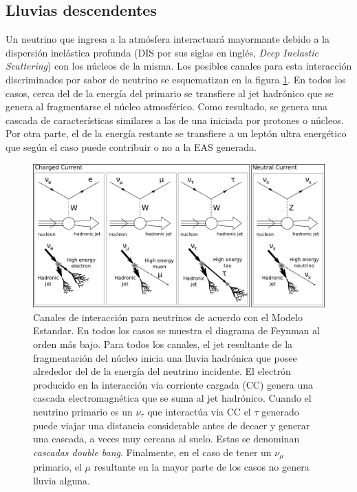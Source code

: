 \subsection{Lluvias descendentes}
\label{sbsc:easDG}

Un neutrino que ingresa a la atm\'osfera interactuar\'a mayormante debido a la dispersión inelástica profunda (DIS por sus siglas en inglés, \emph{Deep Inelastic Scattering}) con los n\'ucleos de la misma.
Los posibles canales para esta interacci\'on discriminados por sabor de neutrino se esquematizan en la figura \ref{fig:SM_nu_int}.
En todos los casos, cerca del  de la energía del primario se transfiere al jet hadrónico que se genera al fragmentarse el n\'ucleo atmosf\'erico.
Como resultado, se genera una cascada de características similares a las de una iniciada por protones o núcleos.
Por otra parte, el  de la energ\'ia restante se transfiere a un leptón ultra energético que según el caso puede contribuir o no a la EAS generada.
%
\begin{figure}[ht]
\begin{center}
\includegraphics[width=1.0\textwidth]{fig/EASAuger/nu_channels_english.pdf}
\caption{Canales de interacción para neutrinos de acuerdo con el Modelo Estandar.
En todos los casos se muestra el diagrama de Feynman al orden más bajo.
Para todos los canales, el jet resultante de la fragmentación del núcleo inicia una lluvia hadrónica que posee alrededor del  de la energía del neutrino incidente.
El electrón producido en la interacción via corriente cargada (CC) genera una cascada electromagnética que se suma al jet hadrónico.
Cuando el neutrino primario es un $\nu_{\tau}$ que interact\'ua via CC el $\tau$ generado puede viajar una distancia considerable antes de decaer y generar una cascada, a veces muy cercana al suelo.
Estas se denominan \emph{cascadas double bang}.
Finalmente, en el caso de tener un $\nu_{\mu}$ primario, el $\mu$ resultante en la mayor parte de los casos no genera lluvia alguna.
}
\label{fig:SM_nu_int}
\end{center}
\end{figure}

